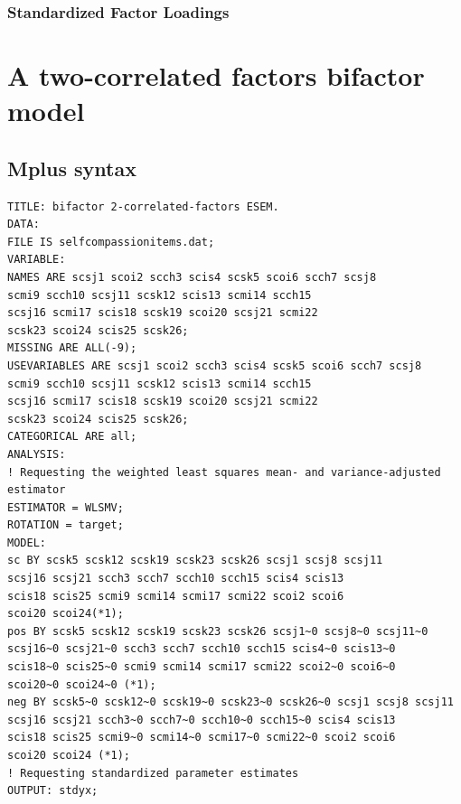 \documentclass[
  english,
  man,floatsintext]{apa7}
\begin{document}
\begin{appendix}
\newpage

\hypertarget{standardized-factor-loadings-1}{%
\subsubsection{Standardized Factor
Loadings}\label{standardized-factor-loadings-1}}



\newpage

\hypertarget{a-two-correlated-factors-bifactor-model}{%
\section{A two-correlated factors bifactor
model}\label{a-two-correlated-factors-bifactor-model}}

\hypertarget{mplus-syntax-1}{%
\subsection{Mplus syntax}\label{mplus-syntax-1}}

\begin{verbatim}
TITLE: bifactor 2-correlated-factors ESEM.
DATA:
FILE IS selfcompassionitems.dat;
VARIABLE:
NAMES ARE scsj1 scoi2 scch3 scis4 scsk5 scoi6 scch7 scsj8
scmi9 scch10 scsj11 scsk12 scis13 scmi14 scch15
scsj16 scmi17 scis18 scsk19 scoi20 scsj21 scmi22
scsk23 scoi24 scis25 scsk26;
MISSING ARE ALL(-9);
USEVARIABLES ARE scsj1 scoi2 scch3 scis4 scsk5 scoi6 scch7 scsj8
scmi9 scch10 scsj11 scsk12 scis13 scmi14 scch15
scsj16 scmi17 scis18 scsk19 scoi20 scsj21 scmi22
scsk23 scoi24 scis25 scsk26;
CATEGORICAL ARE all;
ANALYSIS:
! Requesting the weighted least squares mean- and variance-adjusted estimator
ESTIMATOR = WLSMV;
ROTATION = target;
MODEL:
sc BY scsk5 scsk12 scsk19 scsk23 scsk26 scsj1 scsj8 scsj11
scsj16 scsj21 scch3 scch7 scch10 scch15 scis4 scis13
scis18 scis25 scmi9 scmi14 scmi17 scmi22 scoi2 scoi6
scoi20 scoi24(*1);
pos BY scsk5 scsk12 scsk19 scsk23 scsk26 scsj1~0 scsj8~0 scsj11~0
scsj16~0 scsj21~0 scch3 scch7 scch10 scch15 scis4~0 scis13~0
scis18~0 scis25~0 scmi9 scmi14 scmi17 scmi22 scoi2~0 scoi6~0
scoi20~0 scoi24~0 (*1);
neg BY scsk5~0 scsk12~0 scsk19~0 scsk23~0 scsk26~0 scsj1 scsj8 scsj11
scsj16 scsj21 scch3~0 scch7~0 scch10~0 scch15~0 scis4 scis13
scis18 scis25 scmi9~0 scmi14~0 scmi17~0 scmi22~0 scoi2 scoi6
scoi20 scoi24 (*1);
! Requesting standardized parameter estimates
OUTPUT: stdyx;
\end{verbatim}

\newpage


\end{appendix}
\end{document}
